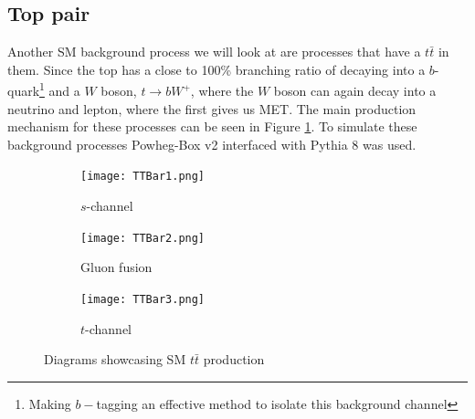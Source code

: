 \documentclass[12pt, a4paper]{book}
\begin{document}
\subsection{Top pair}
Another SM background process we will look at are processes that have a $t\bar{t}$ in them. Since the top has a close to 100\% branching ratio of decaying into a $b$-quark\footnote{Making $b-$tagging an effective method to isolate this background channel} and a $W$ boson, $t\rightarrow bW^+$, where the $W$ boson can again decay into a neutrino and lepton,
where the first gives us MET. The main production mechanism for these processes can be seen in Figure \ref{fig:TT_BKG}. To simulate these background processes Powheg-Box v2 \cite{PowHeg} interfaced with Pythia 8 \cite{Pythia} was used.
\begin{figure}[!ht]
    \centering
    \begin{subfigure}[b]{0.3\textwidth}
        \centering
        \texttt{[image: TTBar1.png]}
        \caption{$s$-channel}
    \end{subfigure}
    \hfill
    \begin{subfigure}[b]{0.3\textwidth}
        \centering
        \texttt{[image: TTBar2.png]}
        \caption{Gluon fusion}
    \end{subfigure}
    \hfill
    \begin{subfigure}[b]{0.3\textwidth}
        \centering
        \texttt{[image: TTBar3.png]}
        \caption{$t$-channel}
    \end{subfigure}
    \caption[$t\bar{t}$ production]{Diagrams showcasing SM $t\bar{t}$ production}\label{fig:TT_BKG}
\end{figure}
\end{document}
